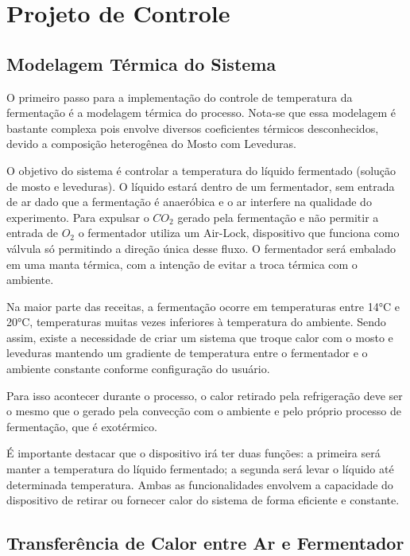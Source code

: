\section{Projeto de Controle}

\subsection{Modelagem Térmica do Sistema}

O primeiro passo para a implementação do controle de temperatura da fermentação é a modelagem térmica do processo. Nota-se que essa modelagem é bastante complexa pois envolve diversos coeficientes térmicos desconhecidos, devido a composição heterogênea do Mosto com Leveduras. 

O objetivo do sistema é controlar a temperatura do líquido fermentado (solução de mosto e leveduras). O líquido estará dentro de um fermentador, sem entrada de ar dado que a fermentação é anaeróbica e o ar interfere na qualidade do experimento. Para expulsar o $CO_2$ gerado pela fermentação e não permitir a entrada de $O_2$ o fermentador utiliza um Air-Lock, dispositivo que funciona como válvula só permitindo a direção única desse fluxo. O fermentador será embalado em uma manta térmica, com a intenção de evitar a troca térmica com o ambiente.

Na maior parte das receitas, a fermentação ocorre em temperaturas entre 14°C e 20°C, temperaturas muitas vezes inferiores à temperatura do ambiente. Sendo assim, existe a necessidade de criar um sistema que troque calor com o mosto e leveduras mantendo um gradiente de temperatura entre o fermentador e o ambiente constante conforme configuração do usuário. 

Para isso acontecer durante o processo, o calor retirado pela refrigeração deve ser o mesmo que o gerado pela convecção com o ambiente e pelo próprio processo de fermentação, que é exotérmico. 


É importante destacar que o dispositivo irá ter duas funções: a primeira será manter a temperatura do líquido fermentado; a segunda será levar o líquido até determinada temperatura. Ambas as funcionalidades envolvem a capacidade do dispositivo de retirar ou fornecer calor do sistema de forma eficiente e constante. 


\subsection{Transferência de Calor entre Ar e Fermentador}

